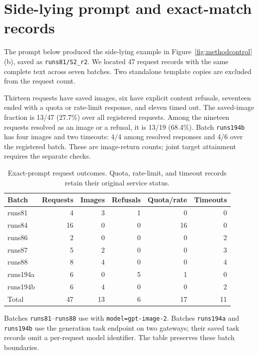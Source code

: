 \clearpage
\onecolumn
\section{Side-lying prompt and exact-match records}
\label{app:sideprompt}
The prompt below produced the side-lying example in Figure~\ref{fig:methodcontrol}(b), saved as \texttt{runs81/S2\_r2}. We located 47 request records with the same complete text across seven batches. Two standalone template copies are excluded from the request count.

Thirteen requests have saved images, six have explicit content refusals, seventeen ended with a quota or rate-limit response, and eleven timed out. The saved-image fraction is 13/47 (27.7\%) over all registered requests. Among the nineteen requests resolved as an image or a refusal, it is 13/19 (68.4\%). Batch \texttt{runs194b} has four images and two timeouts: 4/4 among resolved responses and 4/6 over the registered batch. These are image-return counts; joint target attainment requires the separate \pact{} checks.

\begin{table}[H]\centering\small
\begin{tabular}{lrrrrr}
\toprule
Batch & Requests & Images & Refusals & Quota/rate & Timeouts \\
\midrule
runs81 & 4 & 3 & 1 & 0 & 0 \\
runs84 & 16 & 0 & 0 & 16 & 0 \\
runs86 & 2 & 0 & 0 & 0 & 2 \\
runs87 & 5 & 2 & 0 & 0 & 3 \\
runs88 & 8 & 4 & 0 & 0 & 4 \\
runs194a & 6 & 0 & 5 & 1 & 0 \\
runs194b & 6 & 4 & 0 & 0 & 2 \\
\midrule
Total & 47 & 13 & 6 & 17 & 11 \\
\bottomrule
\end{tabular}
\caption{Exact-prompt request outcomes. Quota, rate-limit, and timeout records retain their original service status.}\label{tab:sidepromptcounts}
\end{table}
Batches \texttt{runs81}--\texttt{runs88} use  with \texttt{model=gpt-image-2}. Batches \texttt{runs194a} and \texttt{runs194b} use the generation task endpoint  on two gateways; their saved task records omit a per-request model identifier. The table preserves these batch boundaries.

